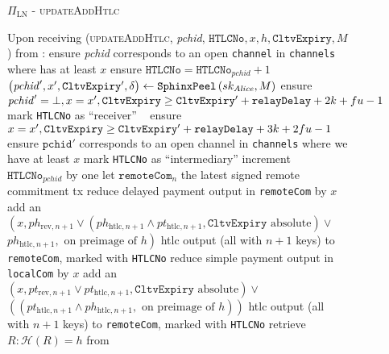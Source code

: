   \begin{figure}[H]
    \begin{protocolbox}{$\Pi_{\mathrm{LN}}$ - \textsc{updateAddHtlc}}
      \begin{algorithmic}[1]
        \State Upon receiving (\textsc{updateAddHtlc}, \textit{pchid},
        $\mathtt{HTLCNo}, x, h, \mathtt{CltvExpiry}, M$) from \bob:
        \Indent
          \State ensure \textit{pchid} corresponds to an open \texttt{channel}
          in \texttt{channels} where \bob{} has at least $x$
          \State ensure $\mathtt{HTLCNo} = \mathtt{HTLCNo}_{\mathit{pchid}} + 1$
          \State $\left(\mathit{pchid}', x', \mathtt{CltvExpiry}',
          \delta\right) \gets \mathtt{SphinxPeel}\left(sk_{\mathit{Alice}}, M\right)$
            \State ensure $\mathit{pchid}' = \bot, x = x', \mathtt{CltvExpiry}
            \geq \mathtt{CltvExpiry}' + \mathtt{relayDelay} + 2k + fu{} -
            1$
            \State mark \texttt{HTLCNo} as ``receiver''
          \Else \ 
            \State ensure $x = x', \mathtt{CltvExpiry} \geq \mathtt{CltvExpiry}'
            + \mathtt{relayDelay} + 3k + 2fu{} - 1$
            \State ensure $\mathtt{pchid}'$ corresponds to an open channel in
            \texttt{channels} where we have at least $x$
            \State mark \texttt{HTLCNo} as ``intermediary''
          \EndIf
          \State increment $\mathtt{HTLCNo}_{\mathit{pchid}}$ by one
          \State let $\mathtt{remoteCom}_n$ the latest signed remote commitment
          tx
          \State reduce delayed payment output in \texttt{remoteCom} by $x$
          \State add an $\left(x, ph_{\mathrm{rev}, n+1} \vee
          \left(ph_{\mathrm{htlc}, n+1} \wedge pt_{\mathrm{htlc}, n+1},
          \mathtt{CltvExpiry} \text{ absolute}\right) \vee\right.$
          $\left.ph_{\mathrm{htlc}, n+1}, \text{ on preimage of } h\right)$ htlc
          output (all with $n+1$ keys) to \texttt{remoteCom}, marked with
          \texttt{HTLCNo}
          \State reduce simple payment output in \texttt{localCom} by $x$
          \State add an $\left(x, pt_{\mathrm{rev}, n+1} \vee pt_{\mathrm{htlc},
          n+1}, \mathtt{CltvExpiry} \text{ absolute}\right) \vee$
          $\left(\left(pt_{\mathrm{htlc}, n+1} \wedge ph_{\mathrm{htlc}, n+1},
          \text{ on preimage of } h\right)\right)$ htlc output (all with $n+1$
          keys) to \texttt{remoteCom}, marked with \texttt{HTLCNo}
            \State retrieve $R : \mathcal{H}\left(R\right) = h$ from

\end{algorithmic}
\end{protocolbox}
\end{figure}
